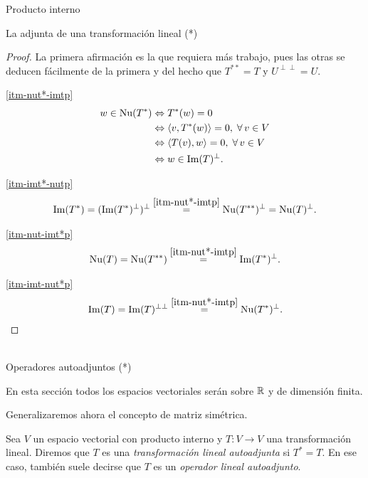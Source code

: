 \begin{chapter}{Producto interno}
\begin{section}{La adjunta de una transformaci\'on lineal (*)}
        \begin{proof}
            La primera afirmación es la que requiera más trabajo, pues las otras se deducen fácilmente de la primera y del hecho que $T^{**} = T$ y $U^{\perp\perp} = U$. 

          \ref{itm-nut*-imtp}
            \begin{align*}
            w \in  \operatorname{Nu}(T^*) &\Leftrightarrow T^*(w) =0 \\&\Leftrightarrow \langle v, T^*(w) \rangle = 0,\; \forall\, v\in V  \\&\Leftrightarrow \langle T(v), w \rangle = 0,\; \forall\, v\in V\\&\Leftrightarrow  w \in \operatorname{Im}(T)^\perp.
            \end{align*}

           \ref{itm-imt*-nutp}
            \begin{align*}
                \operatorname{Im}(T^*) = (\operatorname{Im}(T^*)^{\perp})^{\perp} \stackrel{\ref{itm-nut*-imtp}}{=}    \operatorname{Nu}(T^{**})^{\perp} = \operatorname{Nu}(T)^{\perp}.
            \end{align*}

          \ref{itm-nut-imt*p}
            \begin{align*}
                \operatorname{Nu}(T) = \operatorname{Nu}(T^{**}) \stackrel{\ref{itm-nut*-imtp}}{=}  \operatorname{Im}(T^*)^\perp.
            \end{align*}

           \ref{itm-imt-nut*p}
            \begin{align*}
                \operatorname{Im}(T) = \operatorname{Im}(T)^{\perp\perp}  \stackrel{\ref{itm-nut*-imtp}}{=}  \operatorname{Nu}(T^*)^\perp.
            \end{align*}
        \end{proof}
        
        ${}^{}$

        
    \end{section}



    \begin{section}{Operadores autoadjuntos (*)}\label{secccion-operadores-autoadjuntos}

        En esta sección todos los espacios vectoriales serán sobre $\mathbb R$ y de dimensión finita. 

        Generalizaremos ahora el concepto de matriz simétrica. 
        
        \begin{definicion}
            Sea $V$ un espacio vectorial con producto interno y $T: V \to V$ una transformación lineal. Diremos que $T$ es una \textit{transformación lineal autoadjunta} si $T^* = T$. En  ese caso, también suele decirse que $T$ es un \textit{operador lineal autoadjunto}.
        \end{definicion}
        

\end{section}
\end{chapter}

